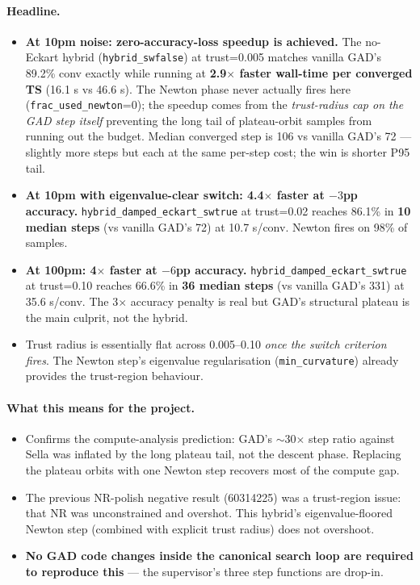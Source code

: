 \documentclass[11pt]{article}
\begin{document}
\paragraph{Headline.}
\begin{itemize}[leftmargin=1.5em]
\item \textbf{At 10pm noise: zero-accuracy-loss speedup is achieved.} The
  no-Eckart hybrid (\texttt{hybrid\_swfalse}) at trust=0.005 matches
  vanilla GAD's 89.2\% conv exactly while running at \textbf{2.9$\times$
  faster wall-time per converged TS} (16.1 s vs 46.6 s). The Newton phase
  never actually fires here (\texttt{frac\_used\_newton}=0); the speedup
  comes from the \emph{trust-radius cap on the GAD step itself} preventing
  the long tail of plateau-orbit samples from running out the
  budget. Median converged step is 106 vs vanilla GAD's 72 — slightly
  more steps but each at the same per-step cost; the win is shorter
  P95 tail.
\item \textbf{At 10pm with eigenvalue-clear switch: 4.4$\times$ faster at $-3$pp accuracy.}
  \texttt{hybrid\_damped\_eckart\_swtrue} at trust=0.02 reaches 86.1\% in
  \textbf{10 median steps} (vs vanilla GAD's 72) at 10.7 s/conv. Newton
  fires on 98\% of samples.
\item \textbf{At 100pm: 4$\times$ faster at $-6$pp accuracy.}
  \texttt{hybrid\_damped\_eckart\_swtrue} at trust=0.10 reaches 66.6\% in
  \textbf{36 median steps} (vs vanilla GAD's 331) at 35.6 s/conv. The
  3$\times$ accuracy penalty is real but GAD's structural plateau is the
  main culprit, not the hybrid.
\item Trust radius is essentially flat across 0.005--0.10 \emph{once the
  switch criterion fires}. The Newton step's eigenvalue regularisation
  (\texttt{min\_curvature}) already provides the trust-region behaviour.
\end{itemize}

\paragraph{What this means for the project.}
\begin{itemize}[leftmargin=1.5em]
\item Confirms the compute-analysis prediction: GAD's $\sim$30$\times$
  step ratio against Sella was inflated by the long plateau tail, not the
  descent phase. Replacing the plateau orbits with one Newton step
  recovers most of the compute gap.
\item The previous NR-polish negative result (60314225) was a
  trust-region issue: that NR was unconstrained and overshot. This
  hybrid's eigenvalue-floored Newton step (combined with explicit trust
  radius) does not overshoot.
\item \textbf{No GAD code changes inside the canonical search loop are
  required to reproduce this} — the supervisor's three step functions are
  drop-in.
\end{itemize}
\end{document}
